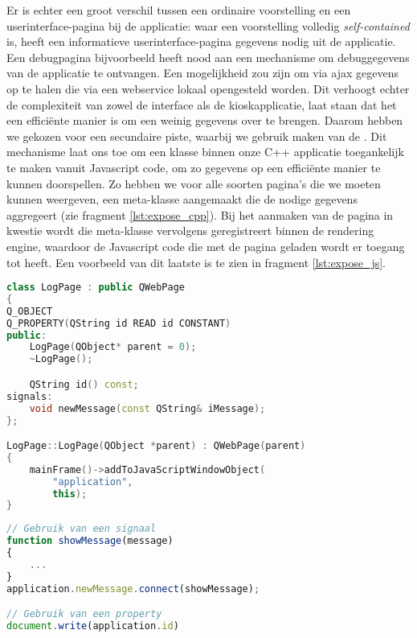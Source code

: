 Er is echter een groot verschil tussen een ordinaire voorstelling en een userinterface-pagina bij de applicatie: waar een voorstelling volledig \emph{self-contained} is, heeft een informatieve userinterface-pagina gegevens nodig uit de applicatie. Een debugpagina bijvoorbeeld heeft nood aan een mechanisme om debuggegevens van de applicatie te ontvangen.
Een mogelijkheid zou zijn om via \ac{ajax} gegevens op te halen die via een webservice lokaal opengesteld worden. Dit verhoogt echter de complexiteit van zowel de interface als de kioskapplicatie, laat staan dat het een efficiënte manier is om een weinig gegevens over te brengen. Daarom hebben we gekozen voor een secundaire piste, waarbij we gebruik maken van de . Dit mechanisme laat ons toe om een klasse binnen onze C++ applicatie toegankelijk te maken vanuit Javascript code, om zo gegevens op een efficiënte manier te kunnen doorspellen. Zo hebben we voor alle soorten pagina's die we moeten kunnen weergeven, een meta-klasse aangemaakt die de nodige gegevens aggregeert (zie fragment \ref{lst:expose_cpp}). Bij het aanmaken van de pagina in kwestie wordt die meta-klasse vervolgens geregistreert binnen de rendering engine, waardoor de Javascript code die met de pagina geladen wordt er toegang tot heeft. Een voorbeeld van dit laatste is te zien in fragment \ref{lst:expose_js}.

\begin{lstlisting}[language=C++, float, caption=Registratie van een klase binnen de rendering engine., label=lst:expose_cpp]
class LogPage : public QWebPage
{
Q_OBJECT
Q_PROPERTY(QString id READ id CONSTANT)
public:
    LogPage(QObject* parent = 0);
    ~LogPage();

    QString id() const;
signals:
    void newMessage(const QString& iMessage);
};

LogPage::LogPage(QObject *parent) : QWebPage(parent)
{
    mainFrame()->addToJavaScriptWindowObject(
    	"application",
        this);
}
\end{lstlisting}

\begin{lstlisting}[language=JavaScript, float, caption=Gebruik van een geregistreerde C++ klasse., label=lst:expose_js]
// Gebruik van een signaal
function showMessage(message)
{
	...
}
application.newMessage.connect(showMessage);

// Gebruik van een property
document.write(application.id)
\end{lstlisting}


